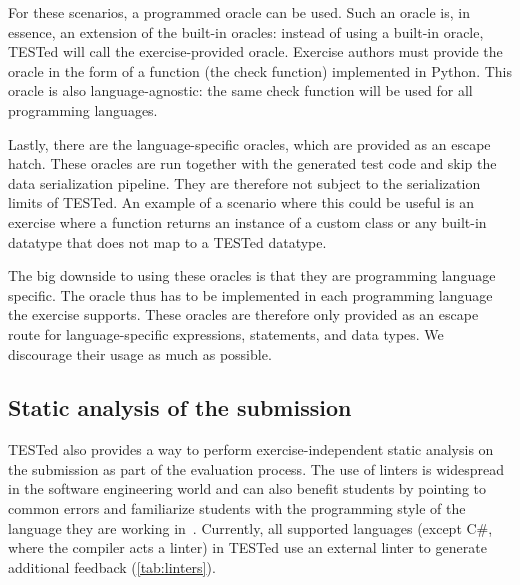 \documentclass[../main]{subfiles}
\begin{document}
For these scenarios, a programmed oracle can be used.
Such an oracle is, in essence, an extension of the built-in oracles: instead of using a built-in oracle, TESTed will call the exercise-provided oracle.
Exercise authors must provide the oracle in the form of a function (the check function) implemented in Python.
This oracle is also language-agnostic: the same check function will be used for all programming languages.

Lastly, there are the language-specific oracles, which are provided as an escape hatch.
These oracles are run together with the generated test code and skip the data serialization pipeline.
They are therefore not subject to the serialization limits of TESTed.
An example of a scenario where this could be useful is an exercise where a function returns an instance of a custom class or any built-in datatype that does not map to a TESTed datatype.

The big downside to using these oracles is that they are programming language specific.
The oracle thus has to be implemented in each programming language the exercise supports.
These oracles are therefore only provided as an escape route for language-specific expressions, statements, and data types.
We discourage their usage as much as possible.

\subsection{Static analysis of the submission}\label{subsec:static-analysis-of-the-submission}

TESTed also provides a way to perform exercise-independent static analysis on the submission as part of the evaluation process.
The use of linters is widespread in the software engineering world and can also benefit students by pointing to common errors and familiarize students with the programming style of the language they are working in~\autocite{alomarUseStaticAnalysis2023}.
Currently, all supported languages (except C\#, where the compiler acts a linter) in TESTed use an external linter to generate additional feedback (\cref{tab:linters}).
\end{document}
